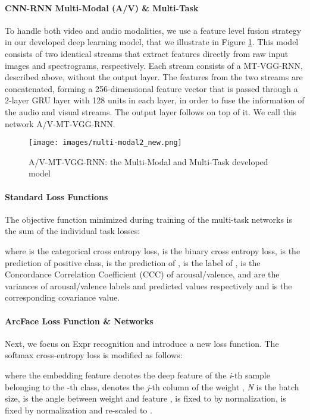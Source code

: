 \documentclass{bmvc2k}
\begin{document}
\paragraph{CNN-RNN Multi-Modal (A/V) \& Multi-Task} 
To handle both video and audio modalities, we use a feature level fusion strategy in our  developed deep learning model, that we illustrate in Figure \ref{multi-modal}. This model consists of two identical streams that extract features directly from raw input images and spectrograms, respectively. Each stream consists of a MT-VGG-RNN, described above, without the output layer. The features from the two streams are concatenated, forming a 256-dimensional feature vector that is passed through a 2-layer GRU layer with 128 units in each layer, in order to fuse the information of the audio and visual streams. The output layer follows on top of it. We call this network A/V-MT-VGG-RNN.


\begin{figure}[h]
\centering
 \texttt{[image: images/multi-modal2\_new.png]} 
\caption{A/V-MT-VGG-RNN: the Multi-Modal and Multi-Task developed model}
\label{multi-modal}
\end{figure}


\paragraph{Standard Loss Functions} 
The objective function minimized during training of the multi-task networks is the sum of the individual task losses:
\vspace*{-4px}

where  is the categorical cross entropy loss,  is the binary cross entropy loss,    is the prediction of positive class,  is the prediction of ,    is the label of ,  is the Concordance Correlation Coefficient (CCC) of arousal/valence,  and  are the variances of arousal/valence labels and predicted values respectively and  is the corresponding covariance value. 

\paragraph{ArcFace Loss Function \& Networks}
Next, we focus on Expr recognition and  introduce a new loss function. The softmax cross-entropy loss is modified as follows:

\noindent where the embedding feature   denotes the deep feature of the \textit{i}-th sample belonging to the -th class,  denotes the \textit{j}-th column of the weight , \textit{N} is the batch size,  is the angle between weight  and feature ,  is fixed to \textit{} by \textit{} normalization,  is fixed by \textit{} normalization and re-scaled to \textit{}.
\end{document}
